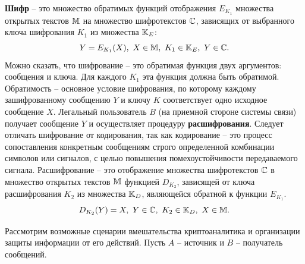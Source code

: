 \textbf{Шифр} -- это множество обратимых функций отображения $E_{K_1}$ множества открытых текстов $\mathbb{M}$ на множество шифротекстов $\mathbb{C}$, зависящих от выбранного ключа шифрования $K_1$ из множества $\mathbb{K}_E$:
\begin{equation}
    \label{eq:Encryption}
    Y = E_{K_1}(X), ~ X \in \mathbb{M}, ~ K_1 \in \mathbb{K}_E, ~ Y \in \mathbb{C}.
\end{equation}
Можно сказать, что шифрование -- это обратимая функция двух аргументов: сообщения и ключа. Для каждого $K_1$ эта функция должна быть обратимой. Обратимость -- основное условие шифрования, по которому каждому зашифрованному сообщению $Y$ и ключу $K$ соответствует одно исходное сообщение $X$. Легальный пользователь $B$ (на приемной стороне системы связи)  получает сообщение $Y$ и осуществляет процедуру \textbf{расшифрования}.
Следует отличать шифрование от кодирования, так как кодирование -- это процесс сопоставления конкретным сообщениям строго определенной комбинации символов или сигналов, с целью повышения помехоустойчивости передаваемого сигнала.
Расшифрование --  это отображение множества шифротекстов $\mathbb{C}$ в множество открытых текстов $\mathbb{M}$ функцией $D_{K_2}$, зависящей от ключа расшифрования $K_2$ из множества $\mathbb{K}_D$, являющейся обратной к функции $E_{K_1}$.
\begin{equation}
    \label{eq:Decryption}
    D_{K_2}(Y) = X, ~ Y \in \mathbb{C}, ~ K_2 \in \mathbb{K}_D, ~ X \in \mathbb{M}.
\end{equation}



Рассмотрим возможные сценарии вмешательства криптоаналитика и организации защиты информации от его действий.
Пусть  $A$ --  источник и $B$ -- получатель сообщений.

